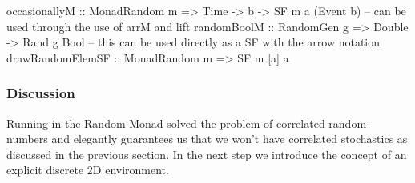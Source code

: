 \begin{HaskellCode}
occasionallyM :: MonadRandom m => Time -> b -> SF m a (Event b)
-- can be used through the use of arrM and lift
randomBoolM :: RandomGen g => Double -> Rand g Bool
-- this can be used directly as a SF with the arrow notation
drawRandomElemSF :: MonadRandom m => SF m [a] a
\end{HaskellCode}

\subsubsection{Discussion} 
Running in the Random Monad solved the problem of correlated random-numbers and elegantly guarantees us that we won't have correlated stochastics as discussed in the previous section. In the next step we introduce the concept of an explicit discrete 2D environment.